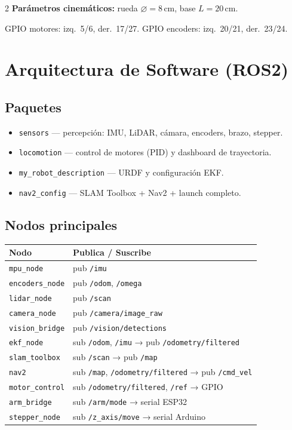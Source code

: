 \documentclass[10pt,a4paper]{article}
\newcommand{\topic}[1]{\texttt{\small #1}}
\newcommand{\pkg}[1]{\texttt{\small #1}}
\begin{document}
\begin{multicols}{2}
\textbf{Parámetros cinemáticos:} rueda $\varnothing = 8\,\text{cm}$, base $L = 20\,\text{cm}$.

GPIO motores: izq.\ 5/6, der.\ 17/27. GPIO encoders: izq.\ 20/21, der.\ 23/24.

\section{Arquitectura de Software (ROS2)}

\subsection{Paquetes}

\begin{itemize}
  \item \pkg{sensors} — percepción: IMU, LiDAR, cámara, encoders, brazo, stepper.
  \item \pkg{locomotion} — control de motores (PID) y dashboard de trayectoria.
  \item \pkg{my\_robot\_description} — URDF y configuración EKF.
  \item \pkg{nav2\_config} — SLAM Toolbox + Nav2 + launch completo.
\end{itemize}

\subsection{Nodos principales}

\begin{tabular}{@{}ll@{}}
\toprule
\textbf{Nodo} & \textbf{Publica / Suscribe} \\
\midrule
\texttt{mpu\_node}        & pub \topic{/imu} \\
\texttt{encoders\_node}   & pub \topic{/odom}, \topic{/omega} \\
\texttt{lidar\_node}      & pub \topic{/scan} \\
\texttt{camera\_node}     & pub \topic{/camera/image\_raw} \\
\texttt{vision\_bridge}   & pub \topic{/vision/detections} \\
\texttt{ekf\_node}        & sub \topic{/odom}, \topic{/imu} → pub \topic{/odometry/filtered} \\
\texttt{slam\_toolbox}    & sub \topic{/scan} → pub \topic{/map} \\
\texttt{nav2}             & sub \topic{/map}, \topic{/odometry/filtered} → pub \topic{/cmd\_vel} \\
\texttt{motor\_control}   & sub \topic{/odometry/filtered}, \topic{/ref} → GPIO \\
\texttt{arm\_bridge}      & sub \topic{/arm/mode} → serial ESP32 \\
\texttt{stepper\_node}    & sub \topic{/z\_axis/move} → serial Arduino \\
\bottomrule
\end{tabular}


\end{multicols}
\end{document}
